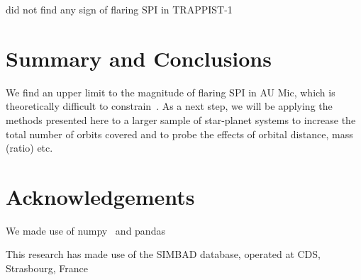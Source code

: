 \documentclass[fleqn,usenatbib,letters]{mnras}%
\begin{document}
\citet{fischer2019} did not find any sign of flaring SPI in TRAPPIST-1  
\section{Summary and Conclusions}
We find an upper limit to the magnitude of flaring SPI in AU Mic, which is theoretically difficult to constrain~\citep{strugarek2019}. As a next step, we will be applying the methods presented here to a larger sample of star-planet systems to increase the total number of orbits covered and to probe the effects of orbital distance, mass (ratio) etc.
\section*{Acknowledgements}
We made use of numpy~\citep{numpy2020} and pandas~\citep{pandas2010,pandas2020software}

This research has made use of the SIMBAD database, operated at CDS, Strasbourg, France~\citep{wenger2000}









\end{document}
